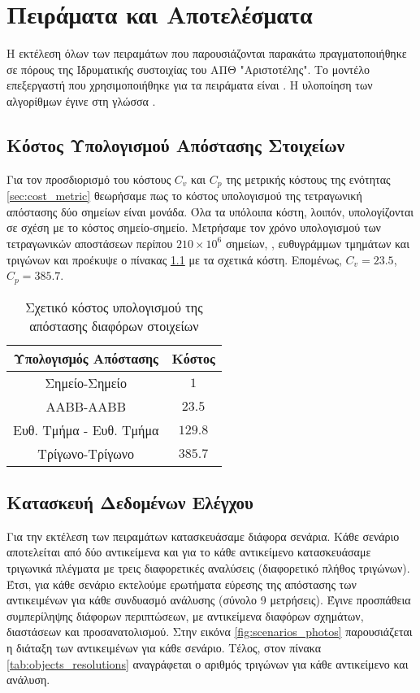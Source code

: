 \chapter{Πειράματα και Αποτελέσματα}
\label{ch:experiments}
Η εκτέλεση όλων των πειραμάτων που παρουσιάζονται παρακάτω 
πραγματοποιήθηκε σε πόρους της Ιδρυματικής συστοιχίας του 
ΑΠΘ "Αριστοτέλης".
Το μοντέλο επεξεργαστή που χρησιμοποιήθηκε για τα πειράματα 
είναι .
Η υλοποίηση των αλγορίθμων έγινε στη γλώσσα . 


\section{Κόστος Υπολογισμού Απόστασης Στοιχείων}
\label{sec:geom_tests_cost}
Για τον προσδιορισμό του κόστους $C_v$ και $C_p$
της μετρικής κόστους της ενότητας \ref{sec:cost_metric}
θεωρήσαμε πως το κόστος υπολογισμού της τετραγωνική απόστασης
δύο σημείων είναι μονάδα.
Όλα τα υπόλοιπα κόστη, λοιπόν, υπολογίζονται σε σχέση με το 
κόστος σημείο-σημείο. 
Μετρήσαμε τον χρόνο υπολογισμού των τετραγωνικών αποστάσεων 
περίπου $210\times10^6$ σημείων, , ευθυγράμμων τμημάτων 
και τριγώνων και προέκυψε ο πίνακας \ref{tab:distance_rel_cost} 
με τα σχετικά κόστη. Επομένως, $C_v=23.5$, $C_p=385.7$.

\begin{table}[h]
    \centering
    \begin{tabular}{|c|c|}
        \hline 
        Υπολογισμός Απόστασης & Κόστος \\
        \hline
        Σημείο-Σημείο & $1$ \\
        \hline 
        AABB-AABB & $23.5$ \\
        \hline
        Ευθ. Τμήμα - Ευθ. Τμήμα & $129.8$ \\
        \hline
        Τρίγωνο-Τρίγωνο & $385.7$ \\
        \hline
    \end{tabular}
    \caption[]{Σχετικό κόστος υπολογισμού της απόστασης διαφόρων στοιχείων}
    \label{tab:distance_rel_cost}
\end{table}

\section{Κατασκευή Δεδομένων Ελέγχου}
Για την εκτέλεση των πειραμάτων κατασκευάσαμε διάφορα σενάρια.
Κάθε σενάριο αποτελείται από δύο αντικείμενα και για το κάθε 
αντικείμενο κατασκευάσαμε τριγωνικά πλέγματα με τρεις διαφορετικές 
αναλύσεις (διαφορετικό πλήθος τριγώνων).
Έτσι, για κάθε σενάριο εκτελούμε ερωτήματα εύρεσης της απόστασης 
των αντικειμένων για κάθε συνδυασμό ανάλυσης (σύνολο 9 μετρήσεις).
Έγινε προσπάθεια συμπερίληψης διάφορων περιπτώσεων, με αντικείμενα 
διαφόρων σχημάτων, διαστάσεων και προσανατολισμού.
Στην εικόνα \ref{fig:scenarios_photos} παρουσιάζεται η διάταξη  
των αντικειμένων για κάθε σενάριο.
Τέλος, στον πίνακα \ref{tab:objects_resolutions}
αναγράφεται ο αριθμός τριγώνων για κάθε αντικείμενο και ανάλυση.

